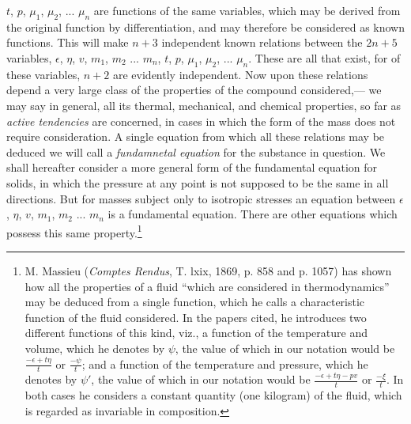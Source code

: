 \documentclass[12pt]{memoir}
\begin{document}
$t$, $p$, $\mu_1$, $\mu_2$,  ... $\mu_n$ are functions of the same variables, which may be derived from the original function by differentiation, and may therefore be considered as known functions. This will make $n+3$ independent known relations between the $2n+5$ variables, $\epsilon$, $\eta$, $v$, $m_1$, $m_2$ ... $m_n$, $t$, $p$, $\mu_1$, $\mu_2$,  ... $\mu_n$. These are all that exist, for of these variables, $n +2$ are evidently independent.  Now upon these relations depend a very large class of the properties of the compound considered,--- we may say in general, all its thermal, mechanical, and chemical properties, so far as \textit{active tendencies} are concerned, in cases in which the form of the mass does not require consideration. A single equation from which all these relations may be deduced we will call a \textit{fundamnetal equation} for the substance in question. We shall hereafter consider a more general form of the fundamental equation for solids, in which the pressure at any point is not supposed to be the same in all directions. But for masses subject only to isotropic stresses an equation between $\epsilon$, $\eta$, $v$, $m_1$, $m_2$ ... $m_n$ is a fundamental equation.  There are other equations which possess this same property.\footnote{M. Massieu (\textit{Comptes Rendus}, T. lxix, 1869, p. 858 and p. 1057) has shown how all the properties of a fluid ``which are considered in thermodynamics'' may be deduced from a single function, which he calls a characteristic function of the fluid considered. In the papers cited, he introduces two different functions of this kind, viz., a function of the temperature and volume, which he denotes by $\psi$, the value of which in our
notation would be $\frac{-\epsilon + t\eta}{t}$ or $\frac{-\psi}{t}$; and a function of the temperature and pressure, which he denotes by $\psi'$, the value of which in our notation would be $\frac{-\epsilon + t\eta-pv}{t}$ or $\frac{-\xi}{t}$. In both cases he considers a constant quantity (one kilogram) of the fluid, which is regarded as invariable in composition.}
\end{document}
